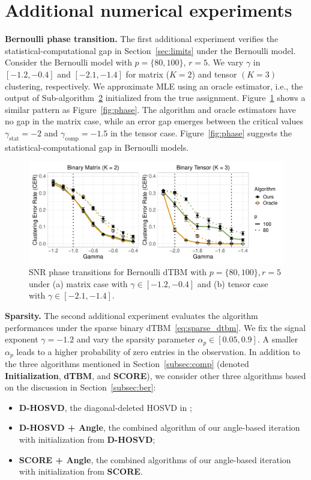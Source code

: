 \documentclass[journal]{IEEEtran}
\theoremstyle{definition}
\theoremstyle{definition}
\begin{document}
\appendices
\section{Additional numerical experiments}
\textbf{Bernoulli phase transition.} The first additional experiment verifies the statistical-computational gap in Section~\ref{sec:limits} under the Bernoulli model. Consider the Bernoulli model with $p = \{80, 100\}$, $r = 5$. We vary $\gamma $ in $ [-1.2, -0.4]$ and $[-2.1, -1.4]$ for matrix ($K=2$) and tensor $(K = 3)$ clustering, respectively. We  approximate MLE using an oracle estimator, i.e., the output of Sub-algorithm~\hyperref[alg:main]{2} initialized from the true assignment. Figure~\ref{fig:phase_binary} shows a similar pattern as Figure~\ref{fig:phase}. The algorithm and oracle estimators have no gap in the matrix case, while an error gap emerges between the critical values $\gamma_{\text{stat}} = -2$ and $\gamma_{\text{comp}} = -1.5$ in the tensor case. Figure~\ref{fig:phase} suggests the statistical-computational gap in Bernoulli models.

\begin{figure}[htb]
    \centering
    \includegraphics[width = \columnwidth]{binary_phase.pdf}
    \caption{SNR phase transitions for Bernoulli dTBM with $p = \{80, 100\}, r = 5$ under (a) matrix case with $\gamma \in [-1.2, -0.4]$ and (b) tensor case with $ \gamma \in [-2.1, -1.4]$.}
    \label{fig:phase_binary}
\end{figure}

{\bf Sparsity.} The second additional experiment evaluates the algorithm performances under the sparse binary dTBM~\eqref{eq:sparse_dtbm}. We fix the signal exponent $\gamma = -1.2$ and vary the sparsity parameter $\alpha_p \in [0.05, 0.9]$. A smaller $\alpha_p$ leads to a higher probability of zero entries in the observation. In addition to the three algorithms mentioned in Section~\ref{subsec:comp} (denoted {\bf \small Initialization}, {\bf \small dTBM}, and {\bf \small SCORE}), we consider other three algorithms based on the discussion in Section~\ref{subsec:ber}: 
  \begin{itemize} 
  \item \textbf{\small D-HOSVD}, the diagonal-deleted HOSVD in \cite{ke2019community}; 
  \item \textbf{\small D-HOSVD + Angle}, the combined algorithm of our angle-based iteration with initialization from \textbf{\small D-HOSVD};
  \item \textbf{\small SCORE + Angle}, the combined algorithms of our angle-based iteration with initialization from \textbf{\small SCORE}.
  \end{itemize}
\end{document}
